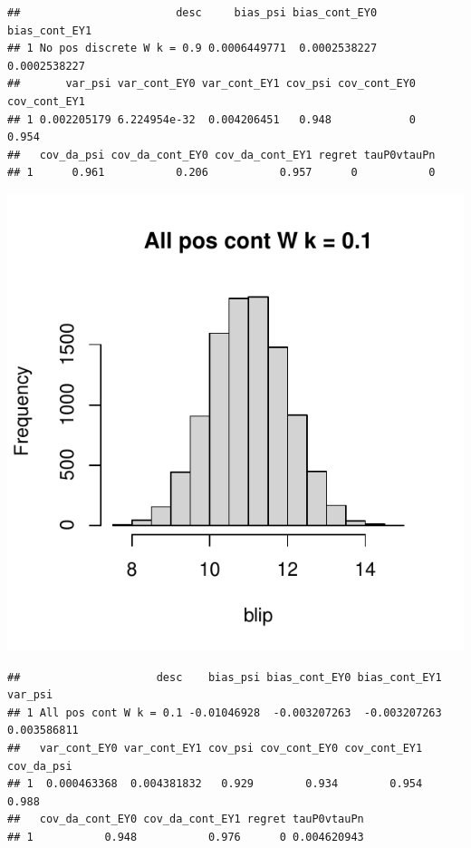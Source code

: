 \documentclass[11pt]{article}\usepackage[]{graphicx}\usepackage[table]{xcolor}
\makeatletter
\def\maxwidth{ %
  \ifdim\Gin@nat@width>\linewidth
    \linewidth
  \else
    \Gin@nat@width
  \fi
}
\newenvironment{kframe}{%
 \def\at@end@of@kframe{}%
 \ifinner\ifhmode%
  \def\at@end@of@kframe{\end{minipage}}%
  \begin{minipage}{\columnwidth}%
 \fi\fi%
 \def\FrameCommand##1{\hskip\@totalleftmargin \hskip-\fboxsep
 \colorbox{shadecolor}{##1}\hskip-\fboxsep
     \hskip-\linewidth \hskip-\@totalleftmargin \hskip\columnwidth}%
 \MakeFramed {\advance\hsize-\width
   \@totalleftmargin\z@ \linewidth\hsize
   \@setminipage}}%
 {\par\unskip\endMakeFramed%
 \at@end@of@kframe}
\newenvironment{knitrout}{}{} %
\makeatother
\begin{document}
\begin{knitrout}
\begin{kframe}\begin{verbatim}
##                        desc     bias_psi bias_cont_EY0 bias_cont_EY1
## 1 No pos discrete W k = 0.9 0.0006449771  0.0002538227  0.0002538227
##       var_psi var_cont_EY0 var_cont_EY1 cov_psi cov_cont_EY0 cov_cont_EY1
## 1 0.002205179 6.224954e-32  0.004206451   0.948            0        0.954
##   cov_da_psi cov_da_cont_EY0 cov_da_cont_EY1 regret tauP0vtauPn
## 1      0.961           0.206           0.957      0           0
\end{verbatim}
\end{kframe}
\includegraphics[width=\maxwidth]{figure/unnamed-chunk-4-7} 
\begin{kframe}\begin{verbatim}
##                     desc    bias_psi bias_cont_EY0 bias_cont_EY1     var_psi
## 1 All pos cont W k = 0.1 -0.01046928  -0.003207263  -0.003207263 0.003586811
##   var_cont_EY0 var_cont_EY1 cov_psi cov_cont_EY0 cov_cont_EY1 cov_da_psi
## 1  0.000463368  0.004381832   0.929        0.934        0.954      0.988
##   cov_da_cont_EY0 cov_da_cont_EY1 regret tauP0vtauPn
## 1           0.948           0.976      0 0.004620943
\end{verbatim}
\end{kframe}

\end{knitrout}
\end{document}
